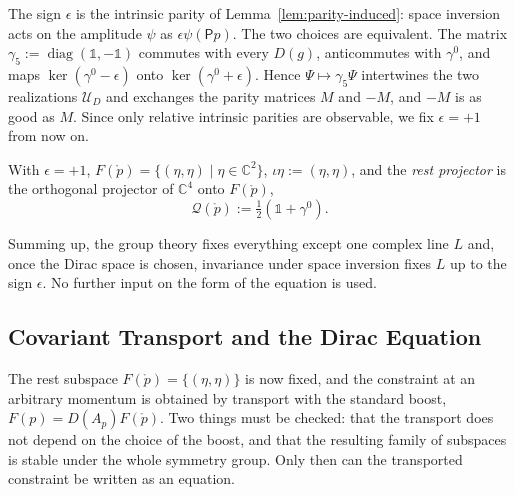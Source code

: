	\begin{remark}\label{rem:intrinsic-parity}
		The sign $\epsilon$ is the intrinsic parity of Lemma~\ref{lem:parity-induced}: space inversion acts on the amplitude $\psi$ as $\epsilon\psi(\mathsf{P}p)$. The two choices are equivalent. The matrix $\gamma_5:=\operatorname{diag}(\mathbb{1},-\mathbb{1})$ commutes with every $D(g)$, anticommutes with $\gamma^0$, and maps $\ker(\gamma^0-\epsilon)$ onto $\ker(\gamma^0+\epsilon)$. Hence $\Psi\mapsto\gamma_5\Psi$ intertwines the two realizations $\mathcal{U}_D$ and exchanges the parity matrices $M$ and $-M$, and $-M$ is as good as $M$. Since only relative intrinsic parities are observable, we fix $\epsilon=+1$ from now on.
	\end{remark}
	
	\begin{definition}\label{def:rest-projector}
		With $\epsilon=+1$, $F(\mathring{p})=\{(\eta,\eta)\mid\eta\in\mathbb{C}^2\}$, $\iota\eta:=(\eta,\eta)$, and the \emph{rest projector} is the orthogonal projector of $\mathbb{C}^4$ onto $F(\mathring{p})$,
		\begin{equation*}
			\mathcal{Q}(\mathring{p}):=\tfrac12(\mathbb{1}+\gamma^0).
		\end{equation*}
	\end{definition}
	
	\noindent Summing up, the group theory fixes everything except one complex line $L$ and, once the Dirac space is chosen, invariance under space inversion fixes $L$ up to the sign $\epsilon$. No further input on the form of the equation is used.
	
	\subsection{Covariant Transport and the Dirac Equation}\label{sec:transport}
	
	The rest subspace $F(\mathring{p})=\{(\eta,\eta)\}$ is now fixed, and the constraint at an arbitrary momentum is obtained by transport with the standard boost, $F(p)=D(A_p)F(\mathring{p})$. Two things must be checked: that the transport does not depend on the choice of the boost, and that the resulting family of subspaces is stable under the whole symmetry group. Only then can the transported constraint be written as an equation.
	
